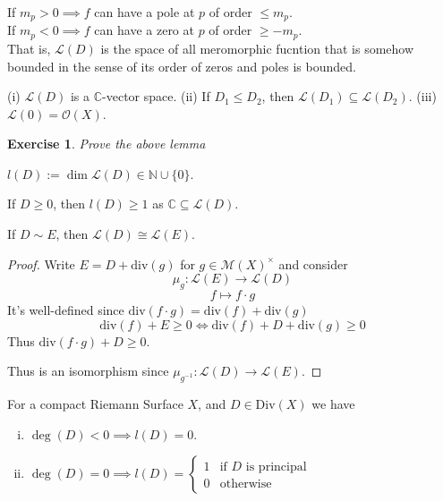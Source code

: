 \documentclass{article}
\newtheorem{exercise}{Exercise}
\begin{document}
\begin{remark}
If $m_p > 0 \implies f$ can have a pole at $p$ of order $\le m_p$. \\
If $m_p < 0 \implies f$ can have a zero at $p$ of order $\ge -m_p$.\\
That is, $\mathcal{L}(D)$ is the space of all meromorphic fucntion that is somehow bounded in the sense of its order of zeros and poles is bounded.
\end{remark}

\begin{lemma}
(i) $\mathcal{L}(D)$ is a $\mathbb{C}$-vector space.
(ii) If $D_1 \le D_2$, then $\mathcal{L}(D_1) \subseteq \mathcal{L}(D_2)$.
(iii) $\mathcal{L}(0) = \mathcal{O}(X)$.
\end{lemma}

\begin{exercise}
    Prove the above lemma
\end{exercise}

\begin{definition}
$l(D) := \dim \mathcal{L}(D) \in \mathbb{N} \cup \{0\}$.
\end{definition}

\begin{example}
If $D \ge 0$, then $l(D) \ge 1$ as $\mathbb{C} \subseteq \mathcal{L}(D)$.
\end{example}

\begin{lemma}
If $D \sim E$, then $\mathcal{L}(D) \cong \mathcal{L}(E)$.
\end{lemma}

\begin{proof}
Write $E = D + \mathrm{div}(g)$ for $g \in \mathcal{M}(X)^\times$ and consider
$$ \mu_g : \mathcal{L}(E) \to \mathcal{L}(D) $$
$$ f \mapsto f \cdot g $$
It's well-defined since $\mathrm{div}(f \cdot g) = \mathrm{div}(f) + \mathrm{div}(g)$
$$ \mathrm{div}(f) + E \ge 0 \iff \mathrm{div}(f) + D + \mathrm{div}(g) \ge 0 $$
Thus $\mathrm{div}(f \cdot g) + D \ge 0$.

Thus is an isomorphism since $\mu_{g^{-1}} : \mathcal{L}(D) \to \mathcal{L}(E)$.
\end{proof}

\begin{lemma}
For a compact Riemann Surface $X$, and $D \in \mathrm{Div}(X)$ we have
\begin{enumerate}[(i)]
    \item $\deg(D) < 0 \implies l(D) = 0$.
    \item $\deg(D) = 0 \implies l(D) = \begin{cases} 1 & \text{if } D \text{ is principal} \\ 0 & \text{otherwise} \end{cases}$
\end{enumerate}
\end{lemma}
\end{document}
